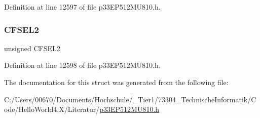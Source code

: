 Definition at line 12597 of file p33\+E\+P512\+M\+U810.\+h.

\mbox{\label{structtag_c_m3_f_l_t_r_b_i_t_s_a136e38e2a181ec59b7952e0a8e019fc4}} 
\subsubsection{\texorpdfstring{C\+F\+S\+E\+L2}{CFSEL2}}
{\footnotesize\ttfamily unsigned C\+F\+S\+E\+L2}



Definition at line 12598 of file p33\+E\+P512\+M\+U810.\+h.



The documentation for this struct was generated from the following file\+:\begin{DoxyCompactItemize}
\item 
C\+:/\+Users/00670/\+Documents/\+Hochschule/\+\_\+\+Tier1/73304\+\_\+\+Technische\+Informatik/\+Code/\+Hello\+World4.\+X/\+Literatur/\hyperlink{p33_e_p512_m_u810_8h}{p33\+E\+P512\+M\+U810.\+h}\end{DoxyCompactItemize}
